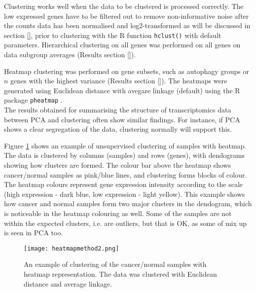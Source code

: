     Clustering works well when the data to be clustered is processed correctly. The low expressed genes have to be filtered out to remove non-informative noise after the counts data has been normalised and log2-transformed as will be discussed in section \ref{}, prior to clustering with the R function \texttt{hclust()} with default parameters. Hierarchical clustering on all genes was performed on all genes on data subgroup averages (Results section \ref{}).
    
    Heatmap clustering was performed on gene subsets, such as autophagy groups or $n$ genes with the highest variance (Results section \ref{}). The heatmaps were generated using Euclidean distance with avegare linkage (default) using the R package  \texttt{pheatmap} \cite{kolde2012pheatmap}.\\
    
    The results obtained for summarising the structure of transcriptomics data between PCA and clustering often show similar findings. For instance, if PCA shows a clear segregation of the data, clustering normally will support this.
    
    Figure \ref{fig:heatmapmethod} shows an example of unsupervised clustering of samples with heatmap. The data is clustered by columns (samples) and rows (genes), with dendograms showing how clusters are formed. The colour bar above the heatmap shows cancer/normal samples as pink/blue lines, and clustering forms blocks of colour. The heatmap colours  represent gene expression intensity according to the scale (high expression - dark blue, low expression - light yellow). This example shows how cancer and normal samples form two major clusters in the dendogram, which is noticeable in the heatmap colouring as well. Some of the samples are not within the expected clusters, i.e. are outliers, but that is OK, as some of mix up is seen in PCA too. 
    
            \begin{figure}[h]
            \centering
            \texttt{[image: heatmapmethod2.png]}
            \caption{An example of clustering of the cancer/normal samples with heatmap representation. The data was clustered with Euclidean distance and average linkage. }
            \label{fig:heatmapmethod}
            \end{figure}
    
    
    
